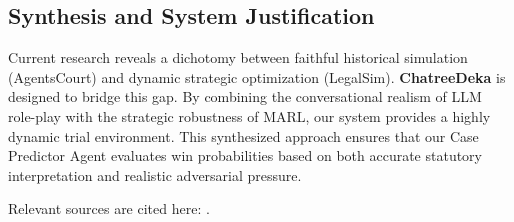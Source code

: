 \subsection{Synthesis and System Justification}
Current research reveals a dichotomy between faithful historical simulation (AgentsCourt) and dynamic strategic optimization (LegalSim). \textbf{ChatreeDeka} is designed to bridge this gap. By combining the conversational realism of LLM role-play with the strategic robustness of MARL, our system provides a highly dynamic trial environment. This synthesized approach ensures that our Case Predictor Agent evaluates win probabilities based on both accurate statutory interpretation and realistic adversarial pressure.

Relevant sources are cited here: \cite{arxiv_2403_02959, arxiv_2510_03405, iarjset_2025_12321, researchgate_chatbots_free_legal, researchgate_ai_legal_practice}.
